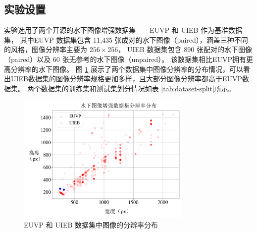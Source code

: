 \subsection{实验设置}
实验选用了两个开源的水下图像增强数据集——EUVP \cite{funie_gan} 和 UIEB \cite{uieb} 作为基准数据集，
其中EUVP 数据集包含 11,435 张成对的水下图像（paired），涵盖三种不同的风格，图像分辨率主要为 $256 \times 256$，
UIEB 数据集包含 890 张配对的水下图像（paired）以及 60 张无参考的水下图像（unpaired）。
该数据集相比EUVP拥有更高分辨率的水下图像。
图 \ref{img:scatter} 展示了两个数据集中图像分辨率的分布情况，可以看出UIEB数据集的图像分辨率规格更加多样，且大部分图像分辨率都高于EUVP数据集。
两个数据集的训练集和测试集划分情况如表 \ref{tab:dataset-split}所示。
\begin{figure}[ht]
    \centering
    \includegraphics[width=0.75\textwidth]{figures/ch3/scatter.pdf} \hspace{0.7cm}
    \caption{EUVP 和 UIEB 数据集中图像的分辨率分布}
    \label{img:scatter}
\end{figure}

\begin{table}[ht]
	\vspace{-0.4mm}
	\centering
	\caption{\label{tab:dataset-split}EUVP与UIEB数据集划分）}
	\vspace{-2mm}
	\vspace{-1mm}
\end{table}   

